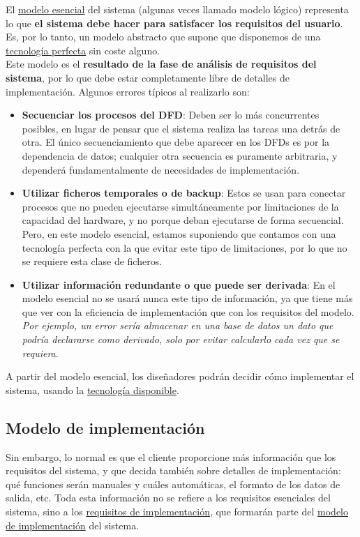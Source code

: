 El \uline{modelo esencial} del sistema (algunas veces llamado modelo lógico) representa lo que \textbf{el sistema debe hacer para satisfacer los requisitos del usuario}. Es, por lo tanto, un modelo abstracto que supone que disponemos de una \uline{tecnología perfecta} sin coste alguno.\\

Este modelo es el \textbf{resultado de la fase de análisis de requisitos del sistema}, por lo que debe estar completamente libre de detalles de implementación. Algunos errores típicos al realizarlo son:

\begin{itemize}
    \item \textbf{Secuenciar los procesos del DFD}: Deben ser lo más concurrentes posibles, en lugar de pensar que el sistema realiza las tareas una detrás de otra. El único secuenciamiento que debe aparecer en los DFDs es por la dependencia de datos; cualquier otra secuencia es puramente arbitraria, y dependerá fundamentalmente de necesidades de implementación.
    \item \textbf{Utilizar ficheros temporales o de backup}: Estos se usan para conectar procesos que no pueden ejecutarse simultáneamente por limitaciones de la capacidad del hardware, y no porque deban ejecutarse de forma secuencial. Pero, en este modelo esencial, estamos suponiendo que contamos con una tecnología perfecta con la que evitar este tipo de limitaciones, por lo que no se requiere esta clase de ficheros.
    \item \textbf{Utilizar información redundante o que puede ser derivada}: En el modelo esencial no se usará nunca este tipo de información, ya que tiene más que ver con la eficiencia de implementación que con los requisitos del modelo. \textit{Por ejemplo, un error sería almacenar en una base de datos un dato que podría declararse como derivado, solo por evitar calcularlo cada vez que se requiera}.
\end{itemize}

A partir del modelo esencial, los diseñadores podrán decidir cómo implementar el sistema, usando la \uline{tecnología disponible}.

\subsection{Modelo de implementación}

Sin embargo, lo normal es que el cliente proporcione más información que los requisitos del sistema, y que decida también sobre detalles de implementación: qué funciones serán manuales y cuáles automáticas, el formato de los datos de salida, etc. Toda esta información no se refiere a los requisitos esenciales del sistema, sino a los \uline{requisitos de implementación}, que formarán parte del \uline{modelo de implementación} del sistema.\\

